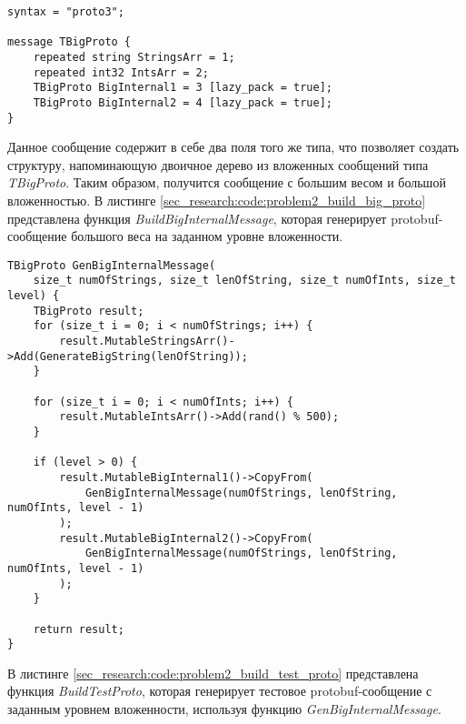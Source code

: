 \noindent\begin{minipage}{\linewidth}
\begin{lstlisting}[style=CodeListing, caption={Тестовое protobuf-сообщение}, label=sec_research:code:problem2_proto]
syntax = "proto3";

message TBigProto {
    repeated string StringsArr = 1;
    repeated int32 IntsArr = 2;
    TBigProto BigInternal1 = 3 [lazy_pack = true];
    TBigProto BigInternal2 = 4 [lazy_pack = true];
}
\end{lstlisting}
\end{minipage}

Данное сообщение содержит в себе два поля того же типа, что позволяет создать структуру, напоминающую двоичное дерево из вложенных сообщений типа \textit{TBigProto}.
Таким образом, получится сообщение с большим весом и большой вложенностью.
В листинге \ref{sec_research:code:problem2_build_big_proto} представлена функция \textit{BuildBigInternalMessage}, которая генерирует protobuf-сообщение большого веса на заданном уровне вложенности.

\noindent\begin{minipage}{\linewidth}
\begin{lstlisting}[style=CodeListing, caption={Функция BuildBigInternalMessage}, label=sec_research:code:problem2_build_big_proto]
TBigProto GenBigInternalMessage(
    size_t numOfStrings, size_t lenOfString, size_t numOfInts, size_t level) {
    TBigProto result;
    for (size_t i = 0; i < numOfStrings; i++) {
        result.MutableStringsArr()->Add(GenerateBigString(lenOfString));
    }

    for (size_t i = 0; i < numOfInts; i++) {
        result.MutableIntsArr()->Add(rand() % 500);
    }

    if (level > 0) {
        result.MutableBigInternal1()->CopyFrom(
            GenBigInternalMessage(numOfStrings, lenOfString, numOfInts, level - 1)
        );
        result.MutableBigInternal2()->CopyFrom(
            GenBigInternalMessage(numOfStrings, lenOfString, numOfInts, level - 1)
        );
    }

    return result;
}
\end{lstlisting}
\end{minipage}

В листинге \ref{sec_research:code:problem2_build_test_proto} представлена функция \textit{BuildTestProto}, которая генерирует тестовое protobuf-сообщение с заданным уровнем вложенности, используя функцию \textit{GenBigInternalMessage}.


